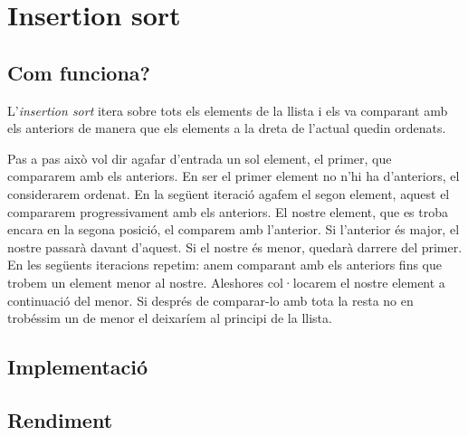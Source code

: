 \chapter{Insertion sort}

\section{Com funciona?}
L'\textit{insertion sort} itera sobre tots els elements de la llista i els va comparant amb els anteriors de manera que els elements a la dreta de l'actual quedin ordenats.

Pas a pas això vol dir agafar d'entrada un sol element, el primer, que compararem amb els anteriors. En ser el primer element no n'hi ha d'anteriors, el considerarem ordenat.
En la següent iteració agafem el segon element, aquest el compararem progressivament amb els anteriors. El nostre element, que es troba encara en la segona posició, el comparem amb l'anterior. Si l'anterior és major, el nostre passarà davant d'aquest. Si el nostre és menor, quedarà darrere del primer.
En les següents iteracions repetim: anem comparant amb els anteriors fins que trobem un element menor al nostre. Aleshores col·locarem el nostre element a continuació del menor. Si després de comparar-lo amb tota la resta no en trobéssim un de menor el deixaríem al principi de la llista.

\section{Implementació}

\vspace{1em}

\begin{minipage}{\textwidth}
	\section{Rendiment}
	\noindent
	\makebox[\textwidth][c]{
		
	}
	\vspace*{1em}
	\begin{center}
		\resizebox{\textwidth}{!}{}
	\end{center}
\end{minipage}